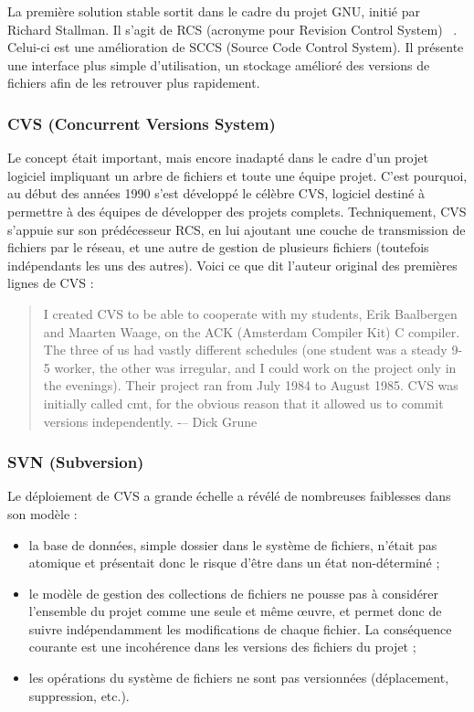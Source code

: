 La première solution stable sortit dans le cadre du projet GNU, initié par Richard Stallman. Il s'agit de RCS (acronyme pour Revision Control System) ~\cite{GNUWebSite}. 
Celui-ci est une amélioration de SCCS (Source Code Control System). Il présente une interface plus simple d'utilisation, un stockage amélioré des versions de fichiers afin de les retrouver plus rapidement. 

\subsubsection{CVS (Concurrent Versions System)}

Le concept était important, mais encore inadapté dans le cadre d'un projet logiciel impliquant un arbre de fichiers et toute une équipe projet. C'est pourquoi, au début des années 1990 s'est développé le célèbre CVS, logiciel destiné à permettre à des équipes de développer des projets complets. Techniquement, CVS s'appuie sur son prédécesseur RCS, en lui ajoutant une couche de transmission de fichiers par le réseau, et une autre de gestion de plusieurs fichiers (toutefois indépendants les uns des autres). Voici ce que dit l'auteur original des premières lignes de CVS :

\begin{quotation}
I created CVS to be able to cooperate with my students, Erik Baalbergen and Maarten Waage, on the ACK (Amsterdam Compiler Kit) C compiler. The three of us had vastly different schedules (one student was a steady 9-5 worker, the other was irregular, and I could work on the project only in the evenings). Their project ran from July 1984 to August 1985. CVS was initially called cmt, for the obvious reason that it allowed us to commit versions independently. 
 -– Dick Grune
\end{quotation}

\subsubsection{SVN (Subversion)}

Le déploiement de CVS a grande échelle a révélé de nombreuses faiblesses dans son modèle :
\begin{itemize}
\item la base de données, simple dossier dans le système de fichiers, n'était pas atomique et présentait donc le risque d'être dans un état non-déterminé ;
\item le modèle de gestion des collections de fichiers ne pousse pas à considérer l'ensemble du projet comme une seule et même œuvre, et permet donc de suivre indépendamment les modifications de chaque fichier. La conséquence courante est une incohérence dans les versions des fichiers du projet ;
\item les opérations du système de fichiers ne sont pas versionnées (déplacement, suppression, etc.).
\end{itemize}

